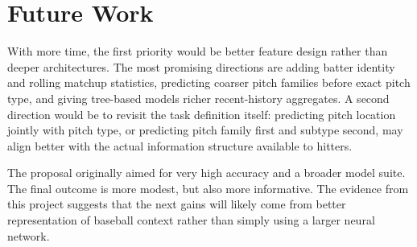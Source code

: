 \documentclass{article}
\begin{document}
\section{Future Work}
With more time, the first priority would be better feature design rather than deeper architectures. The most promising directions are adding batter identity and rolling matchup statistics, predicting coarser pitch families before exact pitch type, and giving tree-based models richer recent-history aggregates. A second direction would be to revisit the task definition itself: predicting pitch location jointly with pitch type, or predicting pitch family first and subtype second, may align better with the actual information structure available to hitters.

The proposal originally aimed for very high accuracy and a broader model suite. The final outcome is more modest, but also more informative. The evidence from this project suggests that the next gains will likely come from better representation of baseball context rather than simply using a larger neural network.

\printbibliography
\end{document}
